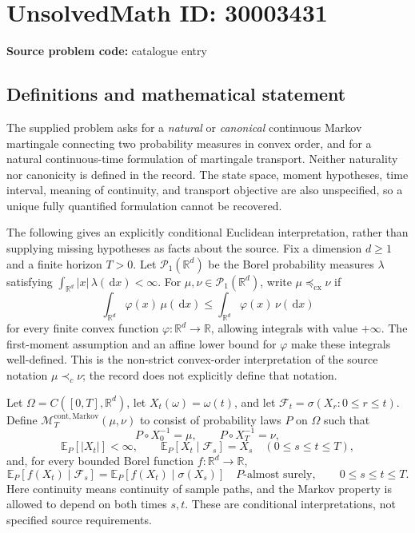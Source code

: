 \documentclass[11pt]{article}
\newcommand{\R}{\mathbb{R}}
\newcommand{\E}{\mathbb{E}}
\newcommand{\dd}{\,\mathrm{d}}
\begin{document}
\section*{UnsolvedMath ID: 30003431}
\textbf{Source problem code:} catalogue entry
\subsection{Definitions and mathematical statement}
The supplied problem asks for a \emph{natural} or \emph{canonical} continuous Markov martingale connecting two probability measures in convex order, and for a natural continuous-time formulation of martingale transport. Neither naturality nor canonicity is defined in the record. The state space, moment hypotheses, time interval, meaning of continuity, and transport objective are also unspecified, so a unique fully quantified formulation cannot be recovered.

The following gives an explicitly conditional Euclidean interpretation, rather than supplying missing hypotheses as facts about the source. Fix a dimension \(d\geq 1\) and a finite horizon \(T>0\). Let \(\mathcal P_1(\R^d)\) be the Borel probability measures \(\lambda\) satisfying \(\int_{\R^d}|x|\,\lambda(\dd x)<\infty\). For \(\mu,\nu\in\mathcal P_1(\R^d)\), write \(\mu\preceq_{\mathrm{cx}}\nu\) if
\[
\int_{\R^d}\varphi(x)\,\mu(\dd x)\leq\int_{\R^d}\varphi(x)\,\nu(\dd x)
\]
for every finite convex function \(\varphi:\R^d\to\R\), allowing integrals with value \(+\infty\). The first-moment assumption and an affine lower bound for \(\varphi\) make these integrals well-defined. This is the non-strict convex-order interpretation of the source notation \(\mu\prec_c\nu\); the record does not explicitly define that notation.

Let \(\Omega=C([0,T],\R^d)\), let \(X_t(\omega)=\omega(t)\), and let \(\mathcal F_t=\sigma(X_r:0\leq r\leq t)\). Define \(\mathcal M^{\mathrm{cont,Markov}}_T(\mu,\nu)\) to consist of probability laws \(P\) on \(\Omega\) such that
\[
P\circ X_0^{-1}=\mu,\qquad P\circ X_T^{-1}=\nu,
\]
\[
\E_P[|X_t|]<\infty,\qquad
\E_P[X_t\mid\mathcal F_s]=X_s
\quad(0\leq s\leq t\leq T),
\]
and, for every bounded Borel function \(f:\R^d\to\R\),
\[
\E_P[f(X_t)\mid\mathcal F_s]
=\E_P[f(X_t)\mid\sigma(X_s)]
\quad P\text{-almost surely},\qquad 0\leq s\leq t\leq T.
\]
Here continuity means continuity of sample paths, and the Markov property is allowed to depend on both times \(s,t\). These are conditional interpretations, not specified source requirements.
\end{document}
